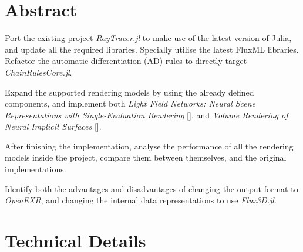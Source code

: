 \section*{Abstract}


Port the existing project \textit{RayTracer.jl} to make use of the latest version of Julia, and update all the required libraries. Specially utilise the latest FluxML libraries. Refactor the automatic differentiation (AD) rules to directly target \textit{ChainRulesCore.jl}.

Expand the supported rendering models by using the already defined components, and implement both \textit{Light Field Networks: Neural Scene Representations with Single-Evaluation Rendering} [\cite{NEURIPS2021_a11ce019}], and \textit{Volume Rendering of Neural Implicit Surfaces} [\cite{NEURIPS2021_25e2a30f}].

After finishing the implementation, analyse the performance of all the rendering models inside the project, compare them between themselves, and the original implementations.

Identify both the advantages and disadvantages of changing the output format to \textit{OpenEXR}, and changing the internal data representations to use \textit{Flux3D.jl}.

\section*{Technical Details}



